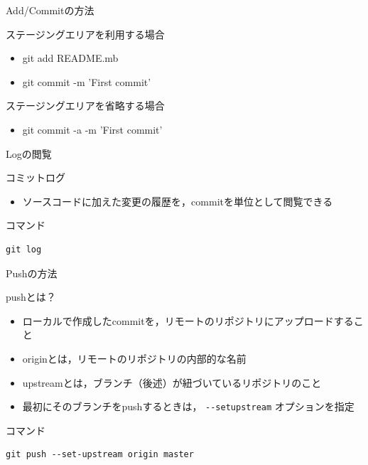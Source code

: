 \documentclass[t, aspectratio=169]{beamer}
\begin{document}
\begin{frame}[label=sec-2-3-4]{Add/Commitの方法}
\begin{block}{ステージングエリアを利用する場合}
\begin{itemize}
\item git add README.mb
\item git commit -m 'First commit'
\end{itemize}
\end{block}
\begin{block}{ステージングエリアを省略する場合}
\begin{itemize}
\item git commit -a -m 'First commit'
\end{itemize}
\end{block}
\end{frame}
\begin{frame}[fragile,label=sec-2-3-5]{Logの閲覧}
 \begin{block}{コミットログ}
\begin{itemize}
\item ソースコードに加えた変更の履歴を，commitを単位として閲覧できる
\end{itemize}
\end{block}
\begin{block}{コマンド}
\begin{verbatim}
git log
\end{verbatim}
\end{block}
\end{frame}

\begin{frame}[fragile,label=sec-2-3-6]{Pushの方法}
 \begin{block}{pushとは？}
\begin{itemize}
\item ローカルで作成したcommitを，リモートのリポジトリにアップロードすること
\item originとは，リモートのリポジトリの内部的な名前
\item upstreamとは，ブランチ（後述）が紐づいているリポジトリのこと
\item 最初にそのブランチをpushするときは， \texttt{-{}-setupstream} オプションを指定
\end{itemize}
\end{block}
\begin{block}{コマンド}
\begin{verbatim}
git push --set-upstream origin master
\end{verbatim}
\end{block}
\end{frame}
\end{document}
